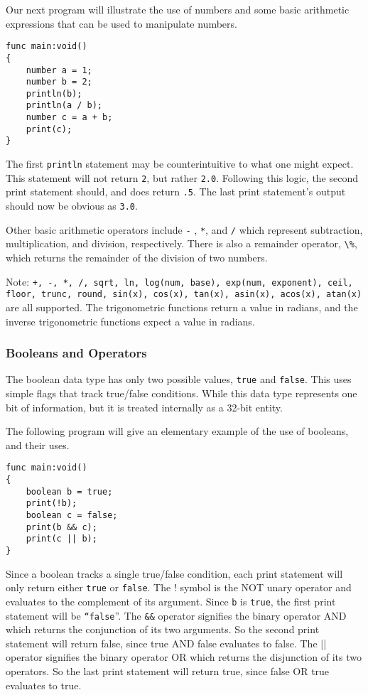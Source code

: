 \documentclass{article}
\begin{document}
Our next program will illustrate the use of numbers and some basic arithmetic expressions that can be used to manipulate numbers.

\begin{verbatim}
func main:void()
{
    number a = 1;
    number b = 2;
    println(b);
    println(a / b);
    number c = a + b;
    print(c);
}
\end{verbatim}

The first \verb!println! statement may be counterintuitive to what one might expect.  This statement will not return \verb!2!, but rather \verb!2.0!.  Following this logic, the second print statement should, and does return \verb!.5!.  The last print statement’s output should now be obvious as \verb!3.0!.

Other basic arithmetic operators include \verb!-! , \verb!*!, and \verb!/! which represent subtraction, multiplication, and division, respectively.  There is also a remainder operator, \verb!\%!,  which returns the remainder of the division of two numbers.

Note: \verb!+, -, *, /, sqrt, ln, log(num, base), exp(num, exponent), ceil, floor, trunc, round, sin(x), cos(x), tan(x), asin(x), acos(x), atan(x)! are all supported. The trigonometric functions return a value in radians, and the inverse trigonometric functions expect a value in radians.

\subsubsection{Booleans and Operators}
The boolean data type has only two possible values, \verb!true! and \verb!false!.  This uses simple flags that track true/false conditions. While this data type represents one bit of information, but it is treated internally as a 32-bit entity.

The following program will give an elementary example of the use of booleans, and their uses.  

\begin{verbatim}
func main:void()
{
    boolean b = true;
    print(!b);
    boolean c = false;
    print(b && c);
    print(c || b);  
}
\end{verbatim}

Since a boolean tracks a single true/false condition, each print statement will only return either \verb!true! or \verb!false!.  The ! symbol is the NOT unary operator and evaluates to the complement of its argument.  Since \verb!b! is \verb!true!, the first print statement will be \verb!“false!”.  The \verb!&&! operator signifies the binary operator AND which returns the conjunction of its two arguments.  So the second print statement will return false, since true AND false evaluates to false. The || operator signifies the binary operator OR which returns the disjunction of its two operators.  So the last print statement will return true, since false OR true evaluates to true. 
\end{document}
